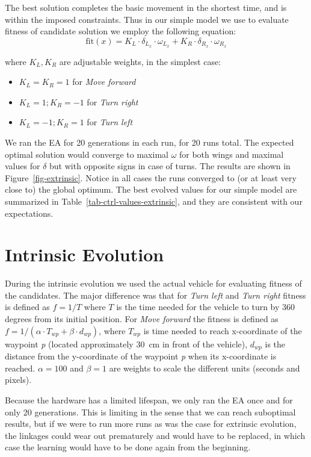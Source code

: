 The best solution completes the basic movement in the shortest time, and is within the imposed constraints. Thus in our simple model we use to evaluate fitness of candidate solution we employ the following equation:
\begin{equation}
\textrm{fit}(x) = K_L \cdot \delta_{L_x} \cdot \omega_{L_x} + K_R \cdot \delta_{R_x} \cdot \omega_{R_x}
\end{equation}

where $K_L, K_R$ are adjustable weights, in the simplest case:
\begin{itemize}
\item $K_L = K_R = 1$ for \textit{Move forward}
\item $K_L = 1; K_R = -1$ for \textit{Turn right}
\item $K_L = -1; K_R = 1$ for \textit{Turn left}
\end{itemize}

We ran the EA for 20 generations in each run, for 20 runs total. The expected optimal solution would converge to maximal $\omega$ for both wings and maximal values for $\delta$ but with opposite signs in case of turns. The results are shown in Figure~\ref{fig-extrinsic}. Notice in all cases the runs converged to (or at least very close to) the global optimum. 
The best evolved values for our simple model are summarized in Table~\ref{tab-ctrl-values-extrinsic}, and they are consistent with our expectations.


\section{Intrinsic Evolution}
\label{subsec-intrinsic}
During the intrinsic evolution we used the actual vehicle for evaluating fitness of the candidates. The major difference was that for \textit{Turn left} and \textit{Turn right} fitness is defined as $f=1/T$ where $T$ is the time needed for the vehicle to turn by 360 degrees from its initial position. For \textit{Move forward} the fitness is defined as $f=1/(\alpha \cdot T_{wp} + \beta \cdot d_{wp})$, where $T_{wp}$ is time needed to reach x-coordinate of the waypoint \textit{p} (located approximately 30~cm in front of the vehicle), $d_{wp}$ is the distance from the y-coordinate of the waypoint \textit{p} when its x-coordinate is reached. $\alpha = 100$ and $\beta = 1$ are weights to scale the different units (seconds and pixels). 

Because the hardware has a limited lifespan, we only ran the EA once and for only 20 generations. This is limiting in the sense that we can reach suboptimal results, but if we were to run more runs as was the case for extrinsic evolution, the linkages could wear out prematurely and would have to be replaced, in which case the learning would have to be done again from the beginning. %

